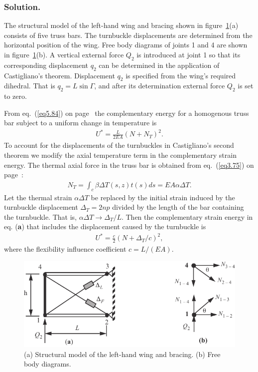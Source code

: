 \documentclass{AeroStructure-ERJohnson}
\begin{document}
\begin{example*}
\subsubsection{Solution.} The structural model of the left-hand wing and bracing shown in figure~\ref{fig6.22}(a) consists of five truss bars. The turnbuckle displacements are determined from the horizontal position of the wing. Free body diagrams of joints 1 and 4 are shown in figure~\ref{fig6.22}(b). A vertical external force $Q_2$ is introduced at joint 1 so that its corresponding displacement $q_2$ can be determined in the application of Castigliano's theorem. Displacement $q_2$ is specified from the wing's required dihedral. That is $q_{2}=L \sin \Gamma$, and after its determination external force $Q_{2}$ is set to zero.

From eq.~(\ref{eq5.84}) on page~\pageref{eq5.84} the complementary energy for a homogenous truss bar subject to a uniform change in temperature is
\setcounter{equation}{0}\def\theequation{\alph{equation}}
\begin{align}
U^{*}=\frac{L}{2 E A}\left(N+N_{T}\right)^{2}.
\end{align}
To account for the displacements of the turnbuckles in Castigliano's second theorem we modify the axial temperature term in the complementary strain energy. The thermal axial force in the truss bar is obtained from eq.~(\ref{eq3.75}) on page~\pageref{eq3.75}:
\begin{align}
N_{T}=\int_{c} \beta \Delta T(s, z) t(s) d s=E A \alpha \Delta T.
\end{align}
Let the thermal strain $\alpha \Delta T$ be replaced by the initial strain induced by the turnbuckle displacement $\Delta_{T}=2 n p$ divided by the length of the bar containing the turnbuckle. That is, $\alpha \Delta T \rightarrow \Delta_{T} / L$. Then the complementary strain energy in eq. (\textbf{a}) that includes the displacement caused by the turnbuckle is
\begin{align}
U^{*}=\frac{c}{2}\left(N+\Delta_{T} / c\right)^{2},
\end{align}
where the flexibility influence coefficient $c=L /(E A)$.

\begin{figure}[!h]
\centerline{\includegraphics{Figure_6-22.pdf}}
\caption{(a) Structural model of the left-hand wing and bracing. (b) Free body diagrams.}\label{fig6.22}
\end{figure}


\end{example*}
\end{document}
